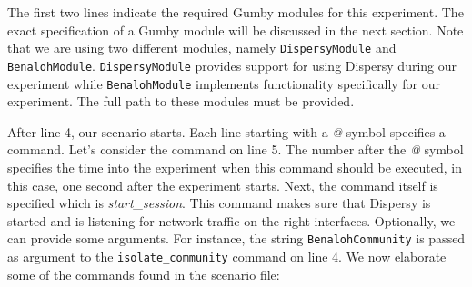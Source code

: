 \documentclass{article}
\begin{document}
The first two lines indicate the required Gumby modules for this experiment.
The exact specification of a Gumby module will be discussed in the next section.
Note that we are using two different modules, namely \texttt{DispersyModule} and \texttt{BenalohModule}.
\texttt{DispersyModule} provides support for using Dispersy during our experiment while \texttt{BenalohModule} implements functionality specifically for our experiment.
The full path to these modules must be provided.

After line 4, our scenario starts.
Each line starting with a \emph{@} symbol specifies a command.
Let's consider the command on line 5.
The number after the \emph{@} symbol specifies the time into the experiment when this command should be executed, in this case, one second after the experiment starts.
Next, the command itself is specified which is \emph{start\_session}.
This command makes sure that Dispersy is started and is listening for network traffic on the right interfaces.
Optionally, we can provide some arguments.
For instance, the string \texttt{BenalohCommunity} is passed as argument to the \texttt{isolate\_community} command on line 4.
We now elaborate some of the commands found in the scenario file:
\end{document}
